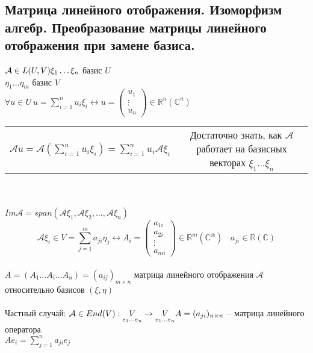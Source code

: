 \documentclass[12pt]{article}
\theoremstyle{remark}
\theoremstyle{definition}
\newcommand{\R}{\mathbb R}
\newcommand{\0}{\mathbb{0}}
\newcommand{\mybox}{
	\collectbox{
		\setlength{\fboxsep}{1pt}
		\fbox{\BOXCONTENT}
	}
}
\newcommand{\A}{\mathcal{A}}
\begin{document}
	\subsection{Матрица линейного отображения. Изоморфизм алгебр. Преобразование матрицы линейного отображения при замене базиса.}
		$\A \in L(U, V)\\
		\xi_1 \ldots \xi_n$ базис $U$\\
		$\eta_1 \ldots \eta_m$ базис $V$\\
		$\forall u \in U \ u = \sum\limits_{i=1}^{n} u_i\xi_i \leftrightarrow u = \left(
		\begin{array}{c}
		u_1 \\
		\vdots\\
		u_n 
		\end{array} \right)
		\in \R^n(\mathbb{C}^n)$\\
	\begin{tabular}{cc}
		$\A u = \A(\sum\limits_{i = 1}^{n}u_i\xi_i) = \sum\limits_{i=1}^{n}u_i\A\xi_i$ &
		Достаточно знать, как $\A$ работает на базисных векторах $\xi_1\ldots\xi_n$
	\end{tabular}\\ \\
	$Im\A = span(\A\xi_1, \A\xi_2, \ldots, \A\xi_n)$\\
	$$\A\xi_i \in V = \sum_{j=1}^{m}a_{ji}\eta_j \leftrightarrow A_i = \left(
		\begin{array}{c}
			a_{1i}\\
			a_{2i}\\
			\vdots\\
			a_{mi}
		\end{array}\right)
	\in \R^m(\mathbb{C^m})\ \ \ \ 
	a_{ji} \in \R(\mathbb{C})
	$$\\
	\mybox{
		$A = (A_1 \ldots A_i \ldots A_n) = (a_{ij})_{m\times n}$
	}
	матрица линейного отображения $\A$ относительно базисов $(\xi, \eta)$\\\\
	Частный случай: $\A\in End(V): \underset{e_1\ldots e_n}{V} \rightarrow \underset{e_1\ldots e_n}{V}\\
	A = (a_{ji})_{n\times n}$ -- матрица линейного оператора\\
	$A e_i = \sum\limits_{j=1}^{n}a_{ji}e_j$
\end{document}
